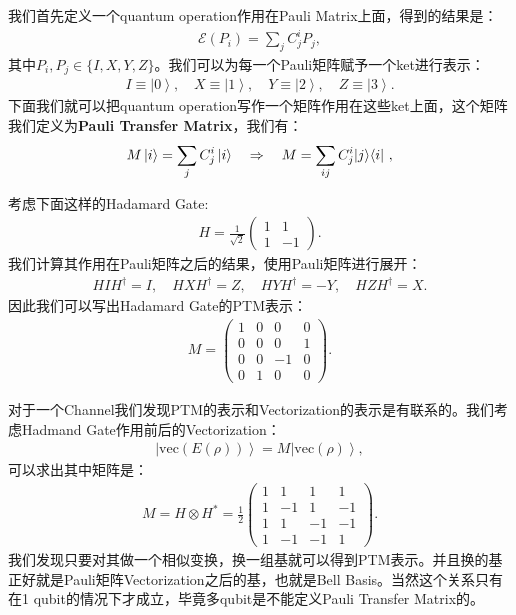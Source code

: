 我们首先定义一个quantum operation作用在Pauli Matrix上面，得到的结果是：
\begin{align}
  \mathcal{E}(P_i)=\sum_jC_j^iP_j,
\end{align}
其中$ P_i, P_j \in \{I,X,Y,Z\} $。我们可以为每一个Pauli矩阵赋予一个ket进行表示：
\begin{align}
  I\equiv\left|0\right\rangle,\quad X\equiv\left|1\right\rangle,\quad Y\equiv\left|2\right\rangle,\quad Z\equiv\left|3\right\rangle.
\end{align}
下面我们就可以把quantum operation写作一个矩阵作用在这些ket上面，这个矩阵我们定义为\textbf{Pauli Transfer Matrix}，我们有：
\begin{align}
  M \left| i \right\rangle = \sum_j C^i_j \left| i \right\rangle \quad \Rightarrow \quad  M=\sum_{ij}C_j^i|j\rangle\langle i|\mathrm{~,}
\end{align}

\bigskip
{}

考虑下面这样的Hadamard Gate:
\begin{align}
  H=\frac{1}{\sqrt{2}}\begin{pmatrix}1&1\\1&-1\end{pmatrix}.
\end{align}
我们计算其作用在Pauli矩阵之后的结果，使用Pauli矩阵进行展开：
\begin{align}
  HIH^\dagger=I,\quad HXH^\dagger=Z,\quad HYH^\dagger=-Y,\quad HZH^\dagger=X.
\end{align}
因此我们可以写出Hadamard Gate的PTM表示：
\begin{align}
  M=\begin{pmatrix}1&0&0&0\\0&0&0&1\\0&0&-1&0\\0&1&0&0\end{pmatrix}.
\end{align}


\bigskip
{}

对于一个Channel我们发现PTM的表示和Vectorization的表示是有联系的。我们考虑Hadmand Gate作用前后的Vectorization：
\begin{align}
  \left|\mathrm{vec}(E(\rho))\right\rangle=M\left|\mathrm{vec}(\rho)\right\rangle,
\end{align}
可以求出其中矩阵是：
\begin{align}
  M=H\otimes H^*=\frac{1}{2}\begin{pmatrix}1&1&1&1\\1&-1&1&-1\\1&1&-1&-1\\1&-1&-1&1\end{pmatrix}.
\end{align}
我们发现只要对其做一个相似变换，换一组基就可以得到PTM表示。并且换的基正好就是Pauli矩阵Vectorization之后的基，也就是Bell Basis。当然这个关系只有在1 qubit的情况下才成立，毕竟多qubit是不能定义Pauli Transfer Matrix的。




